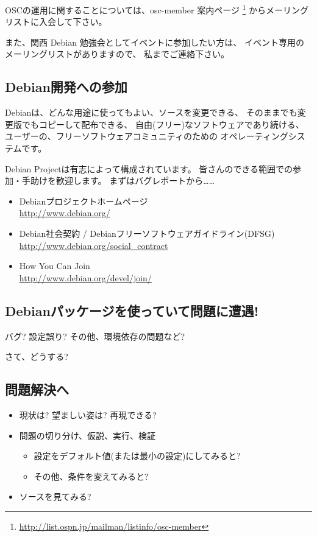 \documentclass[mingoth,a4paper]{jsarticle}
\begin{document}
OSCの運用に関することについては、osc-member 案内ページ
\footnote{\url{http://list.ospn.jp/mailman/listinfo/osc-member}}
からメーリングリストに入会して下さい。

また、関西 Debian 勉強会としてイベントに参加したい方は、
イベント専用のメーリングリストがありますので、
私までご連絡下さい。

\subsection{Debian開発への参加}
Debianは、どんな用途に使ってもよい、ソースを変更できる、
そのままでも変更版でもコピーして配布できる、
自由(フリー)なソフトウェアであり続ける、
ユーザーの、フリーソフトウェアコミュニティのための
オペレーティングシステムです。

Debian Projectは有志によって構成されています。
皆さんのできる範囲での参加・手助けを歓迎します。
まずはバグレポートから……

\begin{itemize}
 \item Debianプロジェクトホームページ \\
       \url{http://www.debian.org/}
 \item Debian社会契約 / Debianフリーソフトウェアガイドライン(DFSG)\\
       \url{http://www.debian.org/social_contract}
 \item How You Can Join\\
       \url{http://www.debian.org/devel/join/}
 \end{itemize}

\subsection{Debianパッケージを使っていて問題に遭遇!}
バグ?
設定誤り?
その他、環境依存の問題など?

さて、どうする?

\subsection{問題解決へ}

\begin{itemize}
 \item 現状は? 望ましい姿は? 再現できる?
 \item 問題の切り分け、仮説、実行、検証
 \begin{itemize}
  \item 設定をデフォルト値(または最小の設定)にしてみると?
  \item その他、条件を変えてみると?
 \end{itemize}
 \item ソースを見てみる?
\end{itemize}
\end{document}
